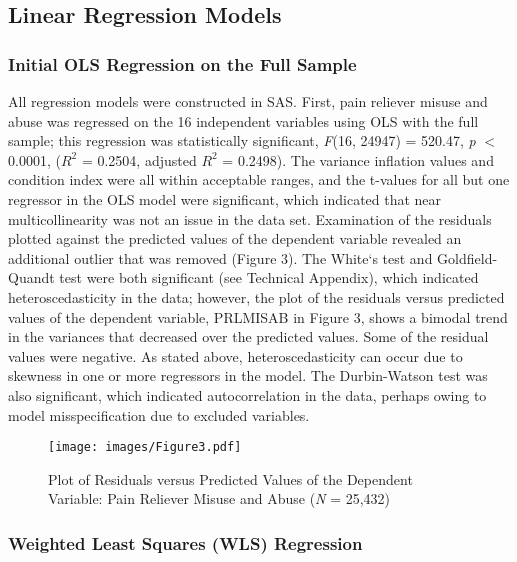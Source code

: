 \documentclass[sigconf]{acmart}
\begin{document}

\subsection{Linear Regression Models}

\subsubsection{Initial OLS Regression on the Full Sample} 
 
All regression models were constructed in SAS. First, pain reliever misuse and 
abuse was regressed on the 16 independent variables using OLS with the full 
sample; this regression was statistically significant, \textit{F}(16, 24947) = 
520.47, \textit{p} $<$ 0.0001, ($R^2$ = 0.2504, adjusted $R^2$ = 0.2498). The 
variance inflation values and condition index were all within acceptable ranges, 
and the t-values for all but one regressor in the OLS model were significant, 
which indicated that near multicollinearity was not an issue in the data set. 
Examination of the residuals plotted against the predicted values of the 
dependent variable revealed an additional outlier that was removed (Figure 3). 
The White`s test and Goldfield-Quandt test were both significant (see Technical 
Appendix), which indicated heteroscedasticity in the data; however, the plot 
of the residuals versus predicted values of the dependent variable, PRLMISAB 
in Figure 3, shows a bimodal trend in the variances that decreased over the 
predicted values. Some of the residual values were negative. As stated above, 
heteroscedasticity can occur due to skewness in one or more regressors in the 
model. The Durbin-Watson test was also significant, which indicated 
autocorrelation in the data, perhaps owing to model misspecification due to 
excluded variables. 

\begin{figure}[!ht]
  \centering\texttt{[image: images/Figure3.pdf]}
  \caption{Plot of Residuals versus Predicted Values of the Dependent Variable: 
  Pain Reliever Misuse and Abuse (\textit{N} = 25,432)}
  \label{f:Figure3}
\end{figure}



\subsubsection{Weighted Least Squares (WLS) Regression} 
\end{document}
